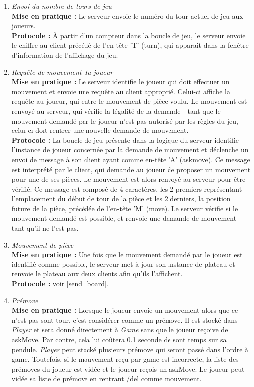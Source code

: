 \documentclass[10pt, a4paper]{article}
\begin{document}
\begin{enumerate}
\item \textit{Envoi du nombre de tours de jeu} \\
\textbf{Mise en pratique :} Le serveur envoie le numéro du tour actuel de jeu aux joueurs.  \\
\textbf{Protocole :} À partir d'un compteur dans la boucle de jeu, le serveur envoie le chiffre au client précédé de l'en-tête 'T' (turn), qui apparait dans la fenêtre d'information de l'affichage du jeu.
\label{send_turn}

\item \textit{Requête de mouvement du joueur} \\
\textbf{Mise en pratique :} Le serveur identifie le joueur qui doit effectuer un mouvement et envoie une requête au client approprié. Celui-ci affiche la requête au joueur, qui entre le mouvement de pièce voulu. Le mouvement est renvoyé au serveur, qui vérifie la légalité de la demande - tant que le mouvement demandé par le joueur n'est pas autorisé par les règles du jeu, celui-ci doit rentrer une nouvelle demande de mouvement.\\
\textbf{Protocole :} La boucle de jeu présente dans la logique du serveur identifie l'instance de joueur concernée par la demande de mouvement et déclenche un envoi de message à son client ayant comme en-tête 'A' (askmove). Ce message est interprété par le client, qui demande au joueur de proposer un mouvement pour une de ses pièces. Le mouvement est alors renvoyé au serveur pour être vérifié. Ce message est composé de 4 caractères, les 2 premiers représentant l'emplacement du début de tour de la pièce et les 2 derniers, la position future de la pièce, précédée de l'en-tête 'M' (move). Le serveur vérifie si le mouvement demandé est possible, et renvoie une demande de mouvement tant qu'il ne l'est pas.

\item \textit{Mouvement de pièce} \\
\textbf{Mise en pratique :} Une fois que le mouvement demandé par le joueur est identifié comme possible, le serveur met à jour son instance de plateau et renvoie le plateau aux deux clients afin qu'ils l'affichent.  \\
\textbf{Protocole :} voir \ref{send_board}.

\item \textit{Prémove} \\
\textbf{Mise en pratique :} Lorsque le joueur envoie un mouvement alors que ce n'est pas sont tour, c'est considérer comme un prémove. Il est stocké dans \textit{Player} et sera donné directement à \textit{Game} sans que le joueur reçoive de askMove. Par contre, cela lui coûtera 0.1 seconde de sont temps sur sa pendule. \textit{Player} peut stocké plusieurs prémove qui seront passé dans l'ordre à game. Toutefois, si le mouvement reçu par game est incorrecte, la liste des prémoves du joueur est vidée et le joueur reçois un askMove. Le joueur peut vidée sa liste de prémove en rentrant /del comme mouvement.


\end{enumerate}
\end{document}
